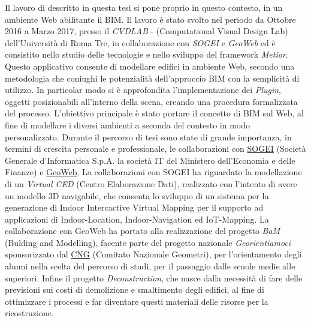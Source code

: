 Il lavoro di descritto in  questa tesi si pone proprio in questo contesto, in un ambiente Web abilitante il BIM.
Il lavoro è stato svolto nel periodo da Ottobre 2016 a Marzo 2017, presso il \emph{CVDLAB} - (Computational Visual Design Lab)
dell'Università di Roma Tre, in collaborazione con \emph{SOGEI} e \emph{GeoWeb}
ed è consistito nello studio delle tecnologie e nello sviluppo del framework \emph{Metior}.
Questo applicativo consente di modellare edifici in ambiente Web, secondo una metodologia che coniughi le potenzialità
dell’approccio BIM con la semplicità di utilizzo.
In particolar modo si è approfondita l'implementazione dei \emph{Plugin}, oggetti posizionabili all'interno della scena, creando
una procedura formalizzata del processo.
L'obiettivo principale è stato portare il concetto di BIM sul Web, al fine di modellare i diversi ambienti a seconda del
contesto in modo personalizzato.
Durante il percorso di tesi sono state di grande importanza, in termini di crescita personale e professionale,
le collaborazioni con \href{http://www.sogei.it/flex/cm/pages/ServeBLOB.php/L/IT/IDPagina/116}{SOGEI}
(Società Generale d'Informatica S.p.A. la società IT del Ministero dell'Economia e delle Finanze)
e \href{http://www.geoweb.it/}{GeoWeb}.
La collaborazioni con SOGEI ha riguardato la modellazione di un \emph{Virtual CED} (Centro Elaborazione Dati),
realizzato con l'intento di avere un modello 3D navigabile, che consenta lo sviluppo di un sistema per
la generazione di Indoor Intercactive Virtual Mapping per il supporto ad applicazioni di Indoor-Location, Indoor-Navigation
ed IoT-Mapping.
La collaborazione con GeoWeb ha portato alla realizzazione del progetto \emph{BaM} (Bulding and Modelling),
facente parte del progetto nazionale \emph{Georientiamoci}
sponsorizzato dal \href{http://www.cng.it/it/consiglio-nazionale}{CNG} (Comitato Nazionale Geometri),
per l'orientamento degli alunni nella scelta del percorso di studi,
per il passaggio dalle scuole medie alle superiori.
Infine il progetto \emph{Deconstruction}, che nasce dalla necessità di fare delle previsioni
sui costi di demolizione e smaltimento degli edifici, al fine di ottimizzare i processi e far
diventare questi materiali delle risorse per la ricostruzione.
\newpage
